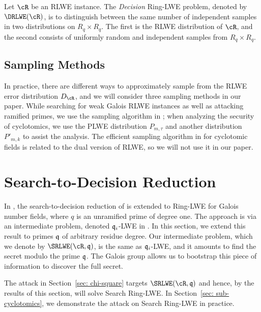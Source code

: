 \documentclass[envcountsame]{llncs}
\begin{document}
\begin{definition}
Let $\cR$ be an RLWE instance. The {\it Decision} Ring-LWE
problem, denoted by $\DRLWE(\cR)$, is to distinguish between the same number of independent samples in two distributions on $R_q \times R_q$. The first is the RLWE distribution of $\cR$, and the second consists of uniformly random and independent samples from $R_q \times R_q$.
\end{definition}

\subsection{Sampling Methods}
In practice, there are different ways to approximately sample from the RLWE error distribution $D_\cR$, and we will consider three sampling methods in our paper. While searching for weak Galois RLWE instances as well as attacking ramified primes, we use the sampling algorithm in  \cite{gentry2008trapdoors}; when analyzing the security of cyclotomics, we use the PLWE distribution $P_{m,\tau}$ and another distribution $P'_{m,k}$ to assist the analysis. The efficient sampling algorithm in \cite{lyubashevsky2013toolkit} for cyclotomic fields is related to the dual version of RLWE, so we will not use it in our paper.


\section{Search-to-Decision Reduction}
\label{sec: s-to-d}

In \cite{eisentrager2014weak}, the search-to-decision reduction of \cite{lyubashevsky2013ideal} is extended to Ring-LWE for Galois number fields, where $q$ is an unramified prime of degree one.  The approach is via an intermediate problem, denoted $\mathfrak{q}_i$-LWE in \cite{lyubashevsky2013ideal}.  In this section, we extend this result to primes $\mathfrak{q}$ of arbitrary residue degree.  Our intermediate problem, which we denote by $\SRLWE(\cR,\fq)$, is the same as $\mathfrak{q}_i$-LWE, and it amounts to find the secret modulo the prime $\mathfrak{q}$.  The Galois group allows us to bootstrap this piece of information to discover the full secret.

The attack in Section~\ref{sec: chi-square} targets $\SRLWE(\cR,\fq)$ and hence, by the results of this section, will solve Search Ring-LWE.  In Section~\ref{sec: sub-cyclotomics}, we demonstrate the attack on Search Ring-LWE in practice.

\end{document}
